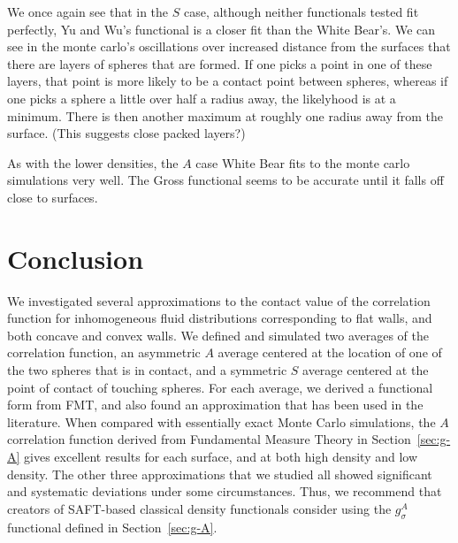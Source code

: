 \documentclass[letterpaper,twocolumn,amsmath,amssymb,jcp,10pt,aip]{revtex4-1}
\begin{document}
We once again see that in the $S$ case, although neither functionals
tested fit perfectly, Yu and Wu's functional is a closer fit than the
White Bear's.  We can see in the monte carlo's oscillations over
increased distance from the surfaces that there are layers of spheres
that are formed.  If one picks a point in one of these layers, that
point is more likely to be a contact point between spheres, whereas if
one picks a sphere a little over half a radius away, the likelyhood is
at a minimum.  There is then another maximum at roughly one radius
away from the surface.  (This suggests close packed layers?)

As with the lower densities, the $A$ case White Bear fits to the monte
carlo simulations very well.  The Gross functional seems to be
accurate until it falls off close to surfaces.

\section{Conclusion}
We investigated several approximations to the contact value of the
correlation function for inhomogeneous fluid distributions
corresponding to flat walls, and both concave and convex walls.  We
defined and simulated two averages of the correlation function, an
asymmetric $A$ average centered at the location of one of the two
spheres that is in contact, and a symmetric $S$ average centered at
the point of contact of touching spheres.  For each average, we
derived a functional form from FMT, and also found an approximation
that has been used in the literature.  When compared with essentially
exact Monte Carlo simulations, the $A$ correlation function derived
from Fundamental Measure Theory in Section~\ref{sec:g-A} gives
excellent results for each surface, and at both high density and low
density.  The other three approximations that we studied all showed
significant and systematic deviations under some circumstances.  Thus,
we recommend that creators of SAFT-based classical density functionals
consider using the $g_\sigma^A$ functional defined in
Section~\ref{sec:g-A}.


\appendix

\end{document}
